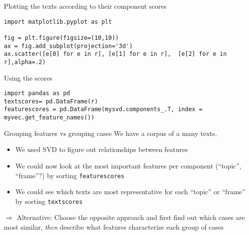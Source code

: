 \begin{frame}[fragile]{Plotting the texts according to their component scores}
\begin{lstlisting}
import matplotlib.pyplot as plt

fig = plt.figure(figsize=(10,10))
ax = fig.add_subplot(projection='3d')
ax.scatter([e[0] for e in r], [e[1] for e in r],  [e[2] for e in r],alpha=.2)
\end{lstlisting}


\end{frame}



\begin{frame}[fragile]{Using the scores}
\begin{lstlisting}
import pandas as pd
textscores= pd.DataFrame(r)
featurescores = pd.DataFrame(mysvd.components_.T, index = myvec.get_feature_names())
\end{lstlisting}


\end{frame}



\begin{frame}{Grouping features vs grouping cases}
  We have a  corpus of a many texts.
  
\begin{itemize}
\item We used SVD to figure out relationships between features
\item We could now look at the most important features per component (``topic'', ``frame''?) by sorting \texttt{featurescores}
\item We could see which texts are most representative for each ``topic'' or ``frame'' by sorting \texttt{textscores}
\end{itemize}
\pause

$\Rightarrow$ Alternative: Choose the opposite approach and first find out which cases are most similar, \textit{then} describe what features characterize each group of cases


\end{frame}





